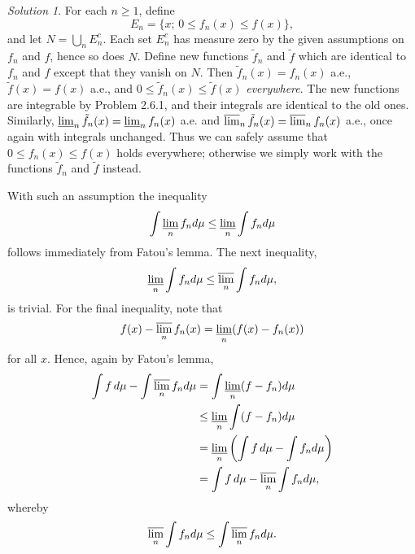 \documentclass{report}
\theoremstyle{remark}
\newtheorem*{solution}{Solution}
\begin{document}
\begin{solution}
  For each $n \ge 1$, define
  \begin{equation*}
    E_n = \{x; \, 0 \le f_n(x) \le f(x)\},
  \end{equation*}
  and let $N = \bigcup_n E_n^c$. Each set $E_n^c$ has measure zero by the given assumptions on $f_n$ and $f$, hence so does $N$. Define new functions $\tilde f_n$ and $\tilde f$ which are identical to $f_n$ and $f$ except that they vanish on $N$. Then $\tilde f_n(x) = f_n(x)$ a.e., $\tilde f(x) = f(x)$ a.e., and $0 \le \tilde f_n(x) \le \tilde f(x)$ \emph{everywhere}. The new functions are integrable by Problem 2.6.1, and their integrals are identical to the old ones. Similarly, $\varliminf_n \tilde f_n(x) = \varliminf_n f_n(x)$ a.e. and $\varlimsup_n \tilde f_n(x) = \varlimsup_n f_n(x)$ a.e., once again with integrals unchanged. Thus we can safely assume that $0 \le f_n(x) \le f(x)$ holds everywhere; otherwise we simply work with the functions $\tilde f_n$ and $\tilde f$ instead.

  With such an assumption the inequality
  \begin{equation*}
    \int \varliminf_n f_n d\mu \le \varliminf_n \int f_n d\mu
  \end{equation*}
  follows immediately from Fatou's lemma. The next inequality,
  \begin{equation*}
    \varliminf_n \int f_n d\mu \le \varlimsup_n \int f_n d\mu,
  \end{equation*}
  is trivial. For the final inequality, note that
  \begin{equation*}
    f(x) - \varlimsup_n f_n(x) = \varliminf_n (f(x) - f_n(x))
  \end{equation*}
  for all $x$. Hence, again by Fatou's lemma,
  \begin{equation*}
    \begin{split}
      \int f \, d\mu - \int \varlimsup_n f_n d\mu &= \int \varliminf_n (f - f_n) d\mu \\
      &\le \varliminf_n \int (f - f_n) d\mu \\
      &= \varliminf_n \left( \int f \, d\mu - \int f_n d\mu \right) \\
      &= \int f \, d\mu - \varlimsup_n \int f_n d\mu,
    \end{split}
  \end{equation*}
  whereby
  \begin{equation*}
    \varlimsup_n \int f_n d\mu \le \int \varlimsup_n f_n d\mu.
  \end{equation*}
\end{solution}
\end{document}

